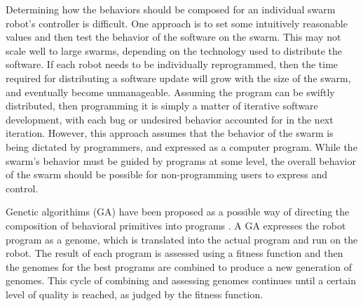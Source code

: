 \documentclass[]{article}
\begin{document}
Determining how the behaviors should be composed for an individual swarm robot's controller is difficult. 
One approach is to set some intuitively reasonable values and then test the behavior of the software on the swarm. 
This may not scale well to large swarms, depending on the technology used to distribute the software. 
If each robot needs to be individually reprogrammed, then the time required for distributing a software update will grow with the size of the swarm, and eventually become unmanageable. 
Assuming the program can be swiftly distributed, then programming it is simply a matter of iterative software development, with each bug or undesired behavior accounted for in the next iteration. 
However, this approach assumes that the behavior of the swarm is being dictated by programmers, and expressed as a computer program. 
While the swarm's behavior must be guided by programs at some level, the overall behavior of the swarm should be possible for non-programming users to express and control. 

Genetic algorithims (GA) have been proposed as a possible way of directing the composition of behavioral primitives into programs \cite{palmer2005emergence}.
A GA expresses the robot program as a genome, which is translated into the actual program and run on the robot. 
The result of each program is assessed using a fitness function and then the genomes for the best programs are combined to produce a new generation of genomes. 
This cycle of combining and assessing genomes continues until a certain level of quality is reached, as judged by the fitness function.
\end{document}

